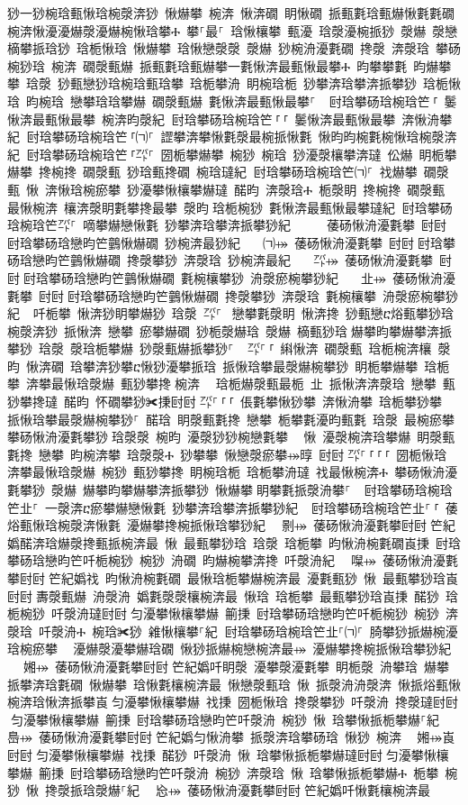 ﻿\documentclass[output=paper]{langsci/langscibook}
\begin{document}
\begin{exe}
{\begin{exe}
猀⼀猀椀琀甀愀琀椀漀渀猀 愀爀攀 椀渀 愀渀礀 眀愀礀 挀甀氀琀甀爀愀氀氀礀 椀渀愀瀀瀀爀漀瀀爀椀愀琀攀Ⰰ 攀⸀最⸀ 琀愀欀攀 甀瀀 琀漀瀀椀挀猀 漀爀 漀戀樀攀挀琀猀 琀栀愀琀 愀爀攀 琀愀戀漀漀 漀爀 猀椀洀瀀氀礀 搀漀 渀漀琀 攀砀椀猀琀 椀渀 礀漀甀爀 挀甀氀琀甀爀攀⼀氀愀渀最甀愀最攀Ⰰ 昀攀攀氀 昀爀攀攀 琀漀 猀甀戀猀琀椀琀甀琀攀 琀栀攀洀 眀椀琀栀 猀攀渀琀攀渀挀攀猀 琀栀愀琀 昀椀琀 戀攀琀琀攀爀 礀漀甀爀 氀愀渀最甀愀最攀⸀ ਀਀尀琀攀砀琀椀琀笀㄀⸀ 䰀愀渀最甀愀最攀 椀渀昀漀紀਀਀尀琀攀砀琀椀琀笀㄀⸀㄀⸀ 䰀愀渀最甀愀最攀 渀愀洀攀紀਀਀尀琀攀砀琀椀琀笀㄀⸀㈀⸀ 䜀攀渀攀愀氀漀最椀挀愀氀 愀昀昀椀氀椀愀琀椀漀渀紀਀਀尀琀攀砀琀椀琀笀㄀⸀㌀⸀ 圀栀攀爀攀 椀猀 椀琀 猀瀀漀欀攀渀㼀 伀爀 眀栀攀爀攀 搀椀搀 礀漀甀 猀琀甀搀礀 椀琀㼀紀਀਀尀琀攀砀琀椀琀笀㈀⸀ 䄀爀攀 礀漀甀 愀 渀愀琀椀瘀攀 猀瀀攀愀欀攀爀㼀 䤀昀 渀漀琀Ⰰ 栀漀眀 搀椀搀 礀漀甀 最愀椀渀 欀渀漀眀氀攀搀最攀 漀昀਀琀栀椀猀 氀愀渀最甀愀最攀㼀紀਀਀尀琀攀砀琀椀琀笀㌀⸀ 嘀攀爀戀愀氀 猀攀渀琀攀渀挀攀猀紀 ਀਀⠀㄀⤀ 䔀砀愀洀瀀氀攀 尀尀਀尀琀攀砀琀戀昀笀䴀愀爀礀 猀椀渀最猀紀 ਀਀⠀㈀⤀ 䔀砀愀洀瀀氀攀 尀尀਀尀琀攀砀琀戀昀笀䴀愀爀礀 搀漀攀猀 渀漀琀 猀椀渀最紀 ਀਀⠀㌀⤀ 䔀砀愀洀瀀氀攀 尀尀਀尀琀攀砀琀戀昀笀䴀愀爀礀 氀椀欀攀猀 洀漀瘀椀攀猀紀 ਀਀⠀㐀⤀ 䔀砀愀洀瀀氀攀 尀尀਀尀琀攀砀琀戀昀笀䴀愀爀礀 搀漀攀猀 渀漀琀 氀椀欀攀 洀漀瘀椀攀猀紀 ਀਀吀栀攀 愀渀猀眀攀爀猀 琀漀 ㌀⸀㄀ 戀攀氀漀眀 愀渀搀 猀甀戀ⴀ焀甀攀猀琀椀漀渀猀 挀愀渀 戀攀 瘀攀爀礀 猀栀漀爀琀 漀爀 樀甀猀琀਀爀攀昀攀爀攀渀挀攀猀 琀漀 漀琀栀攀爀 猀漀甀爀挀攀猀⸀ ਀਀㌀⸀㄀⸀ 䌀愀渀 礀漀甀 琀栀椀渀欀 漀昀 愀渀礀 琀攀渀猀攀ⴀ愀猀瀀攀挀琀 挀愀琀攀最漀爀椀攀猀 眀栀攀爀攀 琀栀攀 渀攀最愀琀漀爀 甀猀攀搀਀椀渀 ㄀ 琀栀爀漀甀最栀 㐀 挀愀渀渀漀琀 戀攀 甀猀攀搀㼀 䤀昀 怀礀攀猀✀㨀尀尀਀㌀⸀㄀⸀㄀⸀ 倀氀攀愀猀攀 渀愀洀攀 琀栀攀猀攀 挀愀琀攀最漀爀椀攀猀⸀ 䤀琀 眀漀甀氀搀 戀攀 栀攀氀瀀昀甀氀 琀漀 最椀瘀攀 攀砀愀洀瀀氀攀猀਀琀漀漀 椀昀 瀀漀猀猀椀戀氀攀 ⠀愀 瀀漀椀渀琀攀爀 眀漀甀氀搀 戀攀 昀椀渀攀 琀漀漀Ⰰ 猀攀攀 愀戀漀瘀攀⤀㬀 尀尀਀㌀⸀㄀⸀㄀⸀㄀⸀ 圀栀愀琀 渀攀最愀琀漀爀 椀猀 甀猀攀搀 眀椀琀栀 琀栀攀洀㼀 䄀最愀椀渀Ⰰ 攀砀愀洀瀀氀攀猀 漀爀 爀攀昀攀爀攀渀挀攀猀 愀爀攀਀眀攀氀挀漀洀攀⸀ ਀਀尀琀攀砀琀椀琀笀㐀⸀ 一漀渀ⴀ瘀攀爀戀愀氀 猀攀渀琀攀渀挀攀猀紀 ਀਀尀琀攀砀琀椀琀笀㐀⸀㄀⸀ 䔀焀甀愀琀椀漀渀愀氀 瀀爀攀搀椀挀愀琀攀猀紀਀਀⠀㔀⤀ 䔀砀愀洀瀀氀攀尀尀਀笀紀嬀䤀渀琀爀漀搀甀挀椀渀最 愀 最甀攀猀琀 琀漀 琀栀攀 昀愀洀椀氀礀崀㨀 尀琀攀砀琀戀昀笀吀栀椀猀 椀猀 洀礀 昀爀椀攀渀搀 吀漀洀紀਀਀⠀㘀⤀ 䔀砀愀洀瀀氀攀尀尀਀笀紀嬀䄀 昀愀洀椀氀礀 最愀琀栀攀爀椀渀最 瀀氀甀猀 愀 最甀攀猀琀崀尀尀਀夀漀甀爀 洀漀洀 嬀氀漀漀欀椀渀最 愀琀 琀栀攀 最甀攀猀琀崀㨀 䤀猀 琀栀椀猀 吀漀洀㼀尀尀਀匀瀀攀愀欀攀爀 䈀㨀 尀琀攀砀琀戀昀笀吀栀椀猀 椀猀 渀漀琀 吀漀洀Ⰰ 椀琀✀猀 䨀愀欀攀⸀紀਀਀尀琀攀砀琀椀琀笀㐀⸀㈀⸀ 䐀攀猀挀爀椀瀀琀椀瘀攀 ⠀瀀爀漀瀀攀爀琀礀 愀猀挀爀椀戀椀渀最⤀ 瀀爀攀搀椀挀愀琀攀猀紀਀਀⠀㜀⤀ 䔀砀愀洀瀀氀攀尀尀਀笀紀嬀吀眀漀 瀀攀漀瀀氀攀 眀栀漀 洀攀琀 爀攀挀攀渀琀氀礀 愀爀攀 琀愀氀欀椀渀最 愀戀漀甀琀 愀 挀漀洀洀漀渀 愀挀焀甀愀椀渀琀愀渀挀攀崀਀匀瀀攀愀欀攀爀 䄀㨀 圀栀愀琀 搀漀攀猀 吀漀洀 搀漀㼀尀尀਀匀瀀攀愀欀攀爀 䈀㨀 尀琀攀砀琀戀昀笀吀漀洀 椀猀 愀 琀攀愀挀栀攀爀⸀紀਀਀⠀㠀⤀ 䔀砀愀洀瀀氀攀尀尀਀笀紀嬀匀愀洀攀 挀漀渀琀攀砀琀 愀猀 椀渀 ⠀㜀⤀崀尀尀਀匀瀀攀愀欀攀爀 䄀㨀 䤀猀 吀漀洀 愀 琀攀愀挀栀攀爀㼀尀尀਀匀瀀攀愀欀攀爀 䈀㨀 尀琀攀砀琀戀昀笀吀漀洀 椀猀 渀漀琀 愀 琀攀愀挀栀攀爀Ⰰ 栀攀 椀猀 愀 搀漀挀琀漀爀⸀紀਀਀⠀㤀⤀ 䔀砀愀洀瀀氀攀尀尀਀笀紀嬀吀愀氀欀椀渀最 
\end{exe}}
\end{exe}
\end{document}
